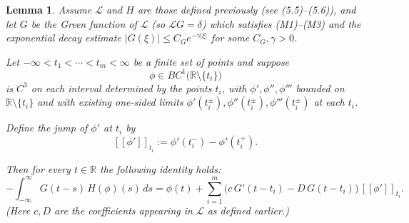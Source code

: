 \documentclass[12pt,letterpaper]{amsart}
\newtheorem{lemma}[theorem]{Lemma}
\theoremstyle{definition}
\theoremstyle{remark}
\numberwithin{equation}{section}
\begin{document}




 
 \begin{lemma}\label{lemma:third_order_cphi3}
 	Assume $\mathcal L$ and $H$ are those defined previously (see (5.5)--(5.6)), and let
 	$G$ be the Green function of $\mathcal L$ (so $\mathcal L G=\delta$) which satisfies
 	(M1)--(M3) and the exponential decay estimate $|G(\xi)|\le C_G e^{-\gamma|\xi|}$
 	for some $C_G,\gamma>0$.
 	
 	Let $-\infty<t_1<\cdots<t_m<\infty$ be a finite set of points and suppose
 	\[
 	\phi\in BC^1\bigl(\mathbb R\setminus\{t_i\}\bigr)
 	\]
 	is $C^3$ on each interval determined by the points $t_i$, with $\phi',\phi'',\phi'''$
 	bounded on $\mathbb R\setminus\{t_i\}$ and with existing one-sided limits
 	$\phi'(t_i^\pm),\phi''(t_i^\pm), \phi'''(t_i^\pm)$ at each $t_i$.
 	
 	Define the jump of $\phi'$ at $t_i$ by
 	\[
 	[\![\phi']\!]_{t_i}:=\phi'(t_i^-)-\phi'(t_i^+).
 	\]
 	
 	Then for every $t\in\mathbb R$ the following identity holds:
 	\[
 	-\int_{-\infty}^{\infty} G(t-s)\,H(\phi)(s)\,ds
 	= \phi(t)
 	+ \sum_{i=1}^{m}\bigl(c\,G'(t-t_i)-D\,G(t-t_i)\bigr)\,[\![\phi']\!]_{t_i}.
 	\]
 	(Here $c,D$ are the coefficients appearing in $\mathcal L$ as defined earlier.)
 \end{lemma}
   
\end{document}
